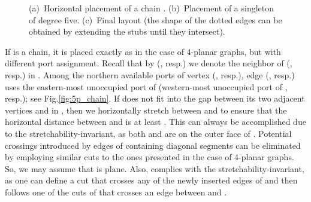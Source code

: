 \documentclass[a4paper,twoside,11pt]{article}
\begin{document}
\begin{figure}[t]
    \centering
    \begin{minipage}[b]{.32\textwidth}
        \centering
    \end{minipage}
    \begin{minipage}[b]{.32\textwidth}
        \centering
    \end{minipage}
    \begin{minipage}[b]{.32\textwidth}
        \centering
    \end{minipage}
    \caption{
    (a)~Horizontal placement of a chain .
    (b)~Placement of a singleton  of degree five.
    (c)~Final layout (the shape of the dotted edges can be obtained by extending the stubs until they intersect).}
    \label{fig:4p_canonical}
\end{figure}

If  is a chain, it is placed
exactly as in the case of 4-planar graphs, but with different port
assignment. Recall that by  (, resp.) we denote the
neighbor of  (, resp.) in . Among the northern
available ports of vertex  (, resp.), edge  (, resp.) uses the eastern-most unoccupied port
of  (western-most unoccupied port of , resp.); see
Fig.\ref{fig:5p_chain}. If  does not fit into the gap between
its two adjacent vertices  and  in , then
we horizontally stretch  between  and  to
ensure that the horizontal distance between  and  is
at least . This can always be accomplished due to the
stretchability-invariant, as both  and  are on the
outer face of . Potential crossings introduced by edges of
 containing diagonal segments can be eliminated by employing
similar cuts to the ones presented in the case of 4-planar graphs.
So, we may assume that  is plane. Also,  complies with
the stretchability-invariant, as one can define a cut that crosses
any of the newly inserted edges of  and then follows one of the
cuts of  that crosses an edge between  and
.
\end{document}
